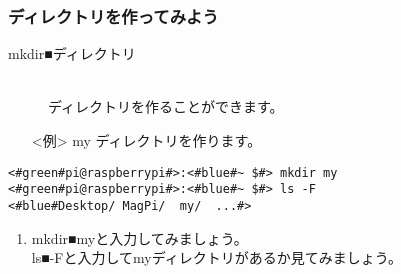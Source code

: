 \subsubsection{ディレクトリを作ってみよう}
\begin{description}
\item[mkdir■ディレクトリ]\mbox{}\\
ディレクトリを作ることができます。
\end{description}
\begin{itemize}
\item[<例>]my ディレクトリを作ります。
\end{itemize}
\begin{lstlisting}[caption=mkdirの例, label=mkdir]
<#green#pi@raspberrypi#>:<#blue#~ $#> mkdir my
<#green#pi@raspberrypi#>:<#blue#~ $#> ls -F
<#blue#Desktop/	MagPi/	my/	 ...#>
\end{lstlisting}
\begin{tcolorbox}[title=\useOmetoi]
\begin{enumerate}
\item mkdir■myと入力してみましょう。\\ls■-Fと入力してmyディレクトリがあるか見てみましょう。\\
\end{enumerate}
\end{tcolorbox}